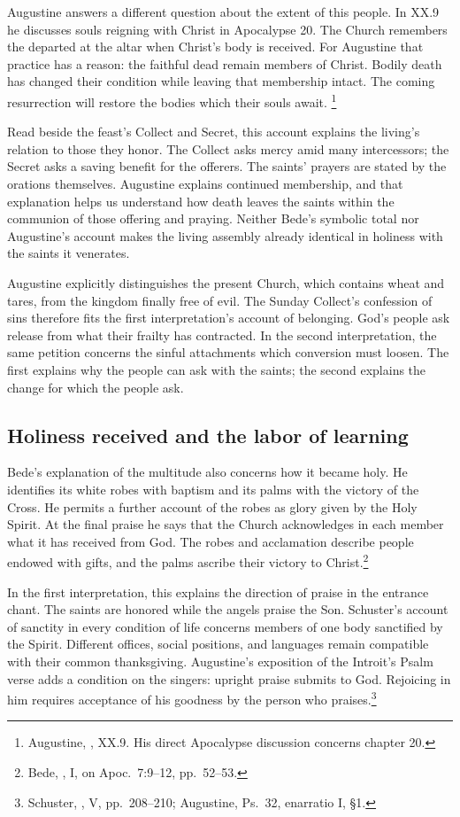 Augustine answers a different question about the extent of this people.
In  XX.9 he discusses souls reigning with Christ
in Apocalypse 20. The Church remembers the departed at the altar when
Christ's body is received. For Augustine that practice has a reason:
the faithful dead remain members of Christ. Bodily death has changed
their condition while leaving that membership intact. The coming
resurrection will restore the bodies which their souls await.
\footnote{Augustine, , XX.9. His direct
Apocalypse discussion concerns chapter 20.}

Read beside the feast's Collect and Secret, this account explains
the living's relation to those they honor. The Collect asks mercy
amid many intercessors; the Secret asks a saving benefit for the
offerers. The saints' prayers are stated by the orations themselves.
Augustine explains continued membership, and that explanation helps
us understand how death leaves the saints within the communion
of those offering and praying. Neither Bede's symbolic total nor
Augustine's account makes the living assembly already identical in
holiness with the saints it venerates.

Augustine explicitly distinguishes the present Church, which contains
wheat and tares, from the kingdom finally free of evil. The Sunday
Collect's confession of sins therefore fits the first interpretation's
account of belonging. God's people ask release from what their frailty
has contracted. In the second interpretation, the same petition
concerns the sinful attachments which conversion must loosen.
The first explains why the people can ask with the saints; the second
explains the change for which the people ask.

\subsection{Holiness received and the labor of learning}
Bede's explanation of the multitude also concerns how it became holy.
He identifies its white robes with baptism and its palms with the
victory of the Cross. He permits a further account of the robes as
glory given by the Holy Spirit. At the final praise he says that the
Church acknowledges in each member what it has received from God.
The robes and acclamation describe people endowed with gifts,
and the palms ascribe their victory to Christ.\footnote{Bede,
, I, on Apoc.~7:9--12, pp.~52--53.}

In the first interpretation, this explains the direction of praise
in the entrance chant. The saints are honored while the angels
praise the Son. Schuster's account of sanctity in every condition
of life concerns members of one body sanctified by the Spirit.
Different offices, social positions, and languages remain compatible
with their common thanksgiving. Augustine's exposition of the
Introit's Psalm verse adds a condition on the singers: upright
praise submits to God. Rejoicing in him requires acceptance of
his goodness by the person who praises.\footnote{Schuster,
, V, pp.~208--210; Augustine,
Ps.~32, enarratio I, \S1.}

